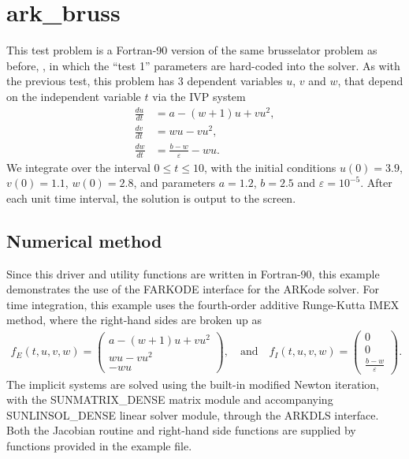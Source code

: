 \documentclass[letterpaper,10pt,english]{sphinxmanual}
\begin{document}
\section{ark\_bruss}
\label{\detokenize{f90_serial:id1}}\label{\detokenize{f90_serial:ark-bruss}}
This test problem is a Fortran-90 version of the same brusselator
problem as before, {\hyperref[\detokenize{c_serial:ark-brusselator}]{}}, in which the “test 1”
parameters are hard-coded into the solver.  As with the previous test,
this problem has 3 dependent variables \(u\), \(v\) and
\(w\), that depend on the independent variable \(t\) via the
IVP system
\begin{equation*}
\begin{split}\frac{du}{dt} &= a - (w+1)u + v u^2, \\
\frac{dv}{dt} &= w u - v u^2, \\
\frac{dw}{dt} &= \frac{b-w}{\varepsilon} - w u.\end{split}
\end{equation*}
We integrate over the interval \(0 \le t \le 10\), with the
initial conditions \(u(0) = 3.9\), \(v(0) = 1.1\),
\(w(0) = 2.8\), and parameters \(a=1.2\), \(b=2.5\) and
\(\varepsilon=10^{-5}\).  After each unit time interval, the
solution is output to the screen.


\subsection{Numerical method}
\label{\detokenize{f90_serial:numerical-method}}
Since this driver and utility functions are written in Fortran-90,
this example demonstrates the use of the FARKODE interface for the
ARKode solver.  For time integration, this example uses the
fourth-order additive Runge-Kutta IMEX method, where the right-hand
sides are broken up as
\begin{equation*}
\begin{split}f_E(t,u,v,w) = \left(\begin{array}{c} a - (w+1)u + v u^2 \\
  w u - v u^2 \\ - w u  \end{array}\right), \quad\text{and}\quad
f_I(t,u,v,w) = \left(\begin{array}{c} 0\\0\\
  \frac{b-w}{\varepsilon}\end{array}\right).\end{split}
\end{equation*}
The implicit systems are solved using the built-in modified Newton
iteration, with the SUNMATRIX\_DENSE matrix module and accompanying
SUNLINSOL\_DENSE linear solver module, through the ARKDLS interface.
Both the Jacobian routine and right-hand side functions are supplied
by functions provided in the example file.
\end{document}
